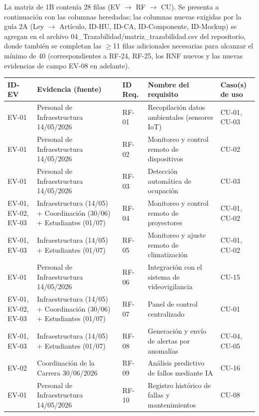 
La matriz de 1B contenía 28 filas (EV $\rightarrow$ RF $\rightarrow$ CU). Se presenta a continuación con las columnas heredadas; las columnas nuevas exigidas por la guía 2A (Ley $\rightarrow$ Artículo, ID-HU, ID-CA, ID-Componente, ID-Mockup) se agregan en el archivo 04\_Trazabilidad/matriz\_trazabilidad.csv del repositorio, donde también se completan las $\geq$11 filas adicionales necesarias para alcanzar el mínimo de 40 (correspondientes a RF-24, RF-25, los RNF nuevos y las nuevas evidencias de campo EV-08 en adelante).


\begingroup
\small
\begin{longtable}{|p{3.1cm}|p{3.1cm}|p{3.1cm}|p{3.1cm}|p{3.1cm}|}
\hline
ID-EV & Evidencia (fuente) & ID Req. & Nombre del requisito & Caso(s) de uso \\ \hline
EV-01 & Personal de Infraestructura 14/05/2026 & RF-01 & Recopilación datos ambientales (sensores IoT) & CU-01, CU-03 \\ \hline
EV-01 & Personal de Infraestructura 14/05/2026 & RF-02 & Monitoreo y control remoto de dispositivos & CU-02 \\ \hline
EV-01 & Personal de Infraestructura 14/05/2026 & RF-03 & Detección automática de ocupación & CU-03 \\ \hline
EV-01, EV-02, EV-03 & Infraestructura (14/05) + Coordinación (30/06) + Estudiantes (01/07) & RF-04 & Monitoreo y control remoto de proyectores & CU-01, CU-02 \\ \hline
EV-01, EV-03 & Infraestructura (14/05) + Estudiantes (01/07) & RF-05 & Monitoreo y ajuste remoto de climatización & CU-01, CU-02 \\ \hline
EV-01 & Personal de Infraestructura 14/05/2026 & RF-06 & Integración con el sistema de videovigilancia & CU-15 \\ \hline
EV-01, EV-02, EV-03 & Infraestructura (14/05) + Coordinación (30/06) + Estudiantes (01/07) & RF-07 & Panel de control centralizado & CU-01 \\ \hline
EV-01, EV-03 & Infraestructura (14/05) + Estudiantes (01/07) & RF-08 & Generación y envío de alertas por anomalías & CU-04, CU-05 \\ \hline
EV-02 & Coordinación de la Carrera 30/06/2026 & RF-09 & Análisis predictivo de fallos mediante IA & CU-16 \\ \hline
EV-01 & Personal de Infraestructura 14/05/2026 & RF-10 & Registro histórico de fallas y mantenimientos & CU-08 \\ \hline

\end{longtable}
